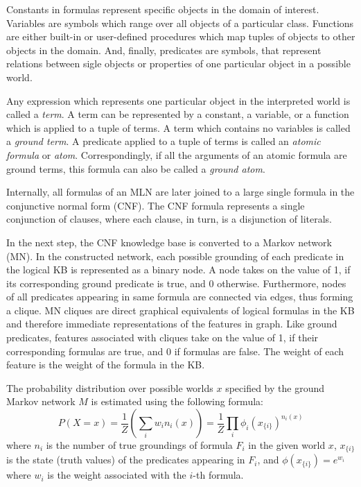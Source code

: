 \documentclass[a4paper,11pt]{article}
\begin{document}
Constants in formulas represent specific objects in the domain of interest.
Variables are symbols which range over all objects of a particular class.
Functions are either built-in or user-defined procedures which map tuples of
objects to other objects in the domain.  And, finally, predicates are symbols,
that represent relations between sigle objects or properties of one particular
object in a possible world.

Any expression which represents one particular object in the interpreted world
is called a \textit{term}.  A term can be represented by a constant, a
variable, or a function which is applied to a tuple of terms.  A term which
contains no variables is called a \textit{ground term}.  A predicate applied
to a tuple of terms is called an \textit{atomic formula} or \textit{atom}.
Correspondingly, if all the arguments of an atomic formula are ground terms,
this formula can also be called a \textit{ground atom}.

Internally, all formulas of an MLN are later joined to a large single formula
in the conjunctive normal form (CNF).  The CNF formula represents a single
conjunction of clauses, where each clause, in turn, is a disjunction of
literals.

In the next step, the CNF knowledge base is converted to a Markov network
(MN).  In the constructed network, each possible grounding of each predicate
in the logical KB is represented as a binary node.  A node takes on the value
of 1, if its corresponding ground predicate is true, and 0 otherwise.
Furthermore, nodes of all predicates appearing in same formula are connected
via edges, thus forming a clique.  MN cliques are direct graphical equivalents
of logical formulas in the KB and therefore immediate representations of the
features in graph.  Like ground predicates, features associated with cliques
take on the value of 1, if their corresponding formulas are true, and 0 if
formulas are false.  The weight of each feature is the weight of the formula
in the KB.

The probability distribution over possible worlds $x$ specified by the ground
Markov network $M$ is estimated using the following formula:
\begin{equation}
  P(X=x) = \frac{1}{Z}\left(\sum_i{w_in_i(x)}\right) = %
    \frac{1}{Z}\prod_i{\phi_i(x_{\{i\}})^{n_i(x)}}
\end{equation}
where $n_i$ is the number of true groundings of formula $F_i$ in the given
world $x$, $x_{\{i\}}$ is the state (truth values) of the predicates appearing
in $F_i$, and $\phi(x_{\{i\}}) = e^{w_i}$ where $w_i$ is the weight associated
with the $i$-th formula.
\end{document}
